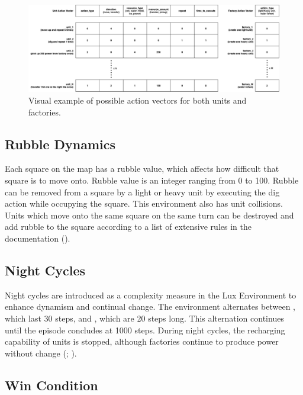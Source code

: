 \begin{figure}[htbp]
    \centering
    \includegraphics[width=1\linewidth]{images/intro_luxenv/action/action_example.png}
    \captionsetup{justification=justified, singlelinecheck=false, width=1\linewidth, labelfont=bf}
    \caption{Visual example of possible action vectors for both units and factories.}
    \label{fig:lux-actions_ex}
\end{figure}

\subsection{Rubble Dynamics}

\noindent Each square on the map has a rubble value, which affects how difficult that square is to move onto. Rubble value is an integer ranging from 0 to 100. Rubble can be removed from a square by a light or heavy unit by executing the dig action while occupying the square. This environment also has unit collisions. Units which move onto the same square on the same turn can be destroyed and add rubble to the square according to a list of extensive rules in the documentation (\textcolor{deepblue}{\cite{lux-ai-season-2}}).

\subsection{Night Cycles}

\noindent Night cycles are introduced as a complexity measure in the Lux Environment to enhance dynamism and continual change. The environment alternates between , which last 30 steps, and , which are 20 steps long. This alternation continues until the episode concludes at 1000 steps. During night cycles, the recharging capability of units is stopped, although factories continue to produce power without change (\textcolor{deepblue}{\cite{lux-ai-season-2}; \cite{chen2023emergent}}).

\subsection{Win Condition}
\label{sec:wincondition}

